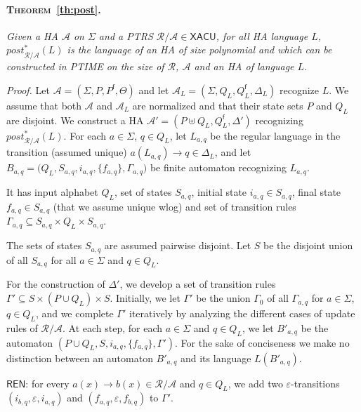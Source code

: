 \documentclass[a4paper]{article}
\theoremstyle{plain}
\newenvironment{proof}{\noindent\emph{Proof.}}{}
\newcommand{\R}{\mathcal{R}}
\newcommand{\F}{\Sigma}
\newcommand{\A}{\mathcal{A}}
\newcommand{\ptrs}[2]{{#1}{/}{#2}}
\newcommand{\final}{\mathsf{f}}
\newcommand{\init}{\mathit{i}}
\newcommand{\post}{\mathit{post}}
\newcommand{\XACU}{\textsf{XACU}}
\newcommand{\REN}{\mathsf{REN}}
\begin{document}
\paragraph{\textsc{Theorem}~\ref{th:post}.}
{\it
Given a HA $\A$ on $\Sigma$ and a PTRS $\ptrs{\R}{\A} \in \XACU$,
for all HA language $L$, $\post_{\ptrs{\R}{\A}}^*(L)$ 
is the language of an HA of size polynomial 
and which can be constructed in PTIME on 
the size of $\R$, $\A$ and an HA of language $L$. }

\medskip
\begin{proof}
Let $\A = (\F, P, P^\final, \Theta)$ and
let  $\A_L = (\F, Q_L, Q_L^\final, \Delta_L)$ recognize $L$.
We assume that both $\A$ and $\A_L$ are normalized and
that their state sets $P$ and $Q_L$ are disjoint.
We construct a HA 
$\A' = (P \uplus Q_L, Q_L^\final, \Delta')$ 
recognizing $\post^*_{\ptrs{\R}{\A}}(L)$. 
For each $a \in \F$, $q \in Q_L$, let $L_{a, q}$ be the regular
language in the transition (assumed unique) $a(L_{a, q}) \to q \in \Delta_L$,
and let 
$B_{a, q} = \bigl(Q_L, S_{a, q}, \init_{a, q}, \{ f_{a, q} \}, \Gamma_{a, q}\bigr)$ 
be finite automaton recognizing $L_{a, q}$.
\begin{RR}
It has input alphabet $Q_L$, set of states $S_{a, q}$, 
initial state $\init_{a, q} \in S_{a, q}$, 
final state $f_{a, q} \in S_{a, q}$ (that we assume unique wlog)
and set of transition rules 
$\Gamma_{a, q} \subseteq S_{a, q} \times Q_L \times S_{a, q}$.
\end{RR}
The sets of states $S_{a, q}$ are assumed pairwise disjoint.
Let $S$ be the disjoint union of all $S_{a,q}$ for all $a \in \F$ and $q\in Q_L$.

For the construction of $\Delta'$, 
we develop a set of transition rules 
$\Gamma' \subseteq S \times (P \cup Q_L) \times S$.
Initially, we let $\Gamma'$ be the union $\Gamma_0$ of all $\Gamma_{a,q}$
for $a \in \Sigma$, $q\in Q_L$, and we complete $\Gamma'$ iteratively 
by analyzing the different cases of update rules of $\ptrs{\R}{\A}$.
At each step,
for each $a \in \F$ and $q \in Q_L$, 
we let $B'_{a, q}$ be the automaton $(P \cup Q_L, S, \init_{a,q}, \{ f_{a, q} \}, \Gamma')$.
For the sake of conciseness we make no distinction
between an automaton $B'_{a, q}$ and its language $L(B'_{a, q})$.




\begin{description}
\item{$\REN$:} for every $a(x) \to b(x) \in \ptrs{\R}{\A}$ and $q \in Q_L$, 
we add two $\varepsilon$-transitions
$(\init_{b,q}, \varepsilon, \init_{a,q})$ and
$(f_{a,q}, \varepsilon, f_{b,q})$ to $\Gamma'$.


\end{description}
\end{proof}
\end{document}
